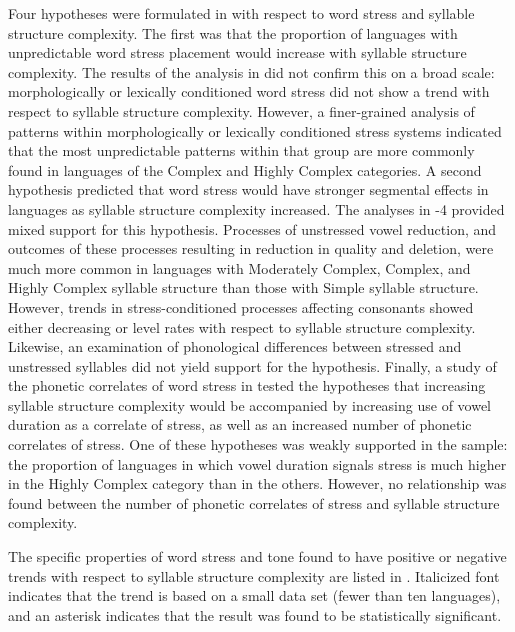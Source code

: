 Four hypotheses were formulated in  with respect to word stress and syllable structure complexity. The first was that the proportion of languages with unpredictable word stress placement would increase with syllable structure complexity. The results of the analysis in  did not confirm this on a broad scale: morphologically or lexically conditioned word stress did not show a trend with respect to syllable structure complexity. However, a finer-grained analysis of patterns within morphologically or lexically conditioned stress systems indicated that the most unpredictable patterns within that group are more commonly found in languages of the Complex and Highly Complex categories. A second hypothesis predicted that word stress would have stronger segmental effects in languages as syllable structure complexity increased. The analyses in -4 provided mixed support for this hypothesis. Processes of unstressed vowel reduction, and outcomes of these processes resulting in reduction in quality and deletion, were much more common in languages with Moderately Complex, Complex, and Highly Complex syllable structure than those with Simple syllable structure. However, trends in stress-conditioned processes affecting consonants showed either decreasing or level rates with respect to syllable structure complexity. Likewise, an examination of phonological differences between stressed and unstressed syllables did not yield support for the hypothesis. Finally, a study of the phonetic correlates of word stress in  tested the hypotheses that increasing syllable structure complexity would be accompanied by increasing use of vowel duration as a correlate of stress, as well as an increased number of phonetic correlates of stress. One of these hypotheses was weakly supported in the sample: the proportion of languages in which vowel duration signals stress is much higher in the Highly Complex category than in the others. However, no relationship was found between the number of phonetic correlates of stress and syllable structure complexity.

  The specific properties of word stress and tone found to have positive or negative trends with respect to syllable structure complexity are listed in . Italicized font indicates that the trend is based on a small data set (fewer than ten languages), and an asterisk indicates that the result was found to be statistically significant.

